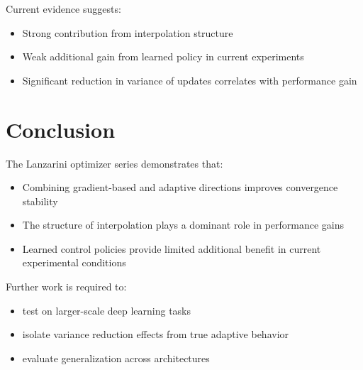 \documentclass{article}
\begin{document}
Current evidence suggests:

\begin{itemize}
    \item Strong contribution from interpolation structure
    \item Weak additional gain from learned policy in current experiments
    \item Significant reduction in variance of updates correlates with performance gain
\end{itemize}

\section{Conclusion}

The Lanzarini optimizer series demonstrates that:

\begin{itemize}
    \item Combining gradient-based and adaptive directions improves convergence stability
    \item The structure of interpolation plays a dominant role in performance gains
    \item Learned control policies provide limited additional benefit in current experimental conditions
\end{itemize}

Further work is required to:
\begin{itemize}
    \item test on larger-scale deep learning tasks
    \item isolate variance reduction effects from true adaptive behavior
    \item evaluate generalization across architectures
\end{itemize}
\end{document}
